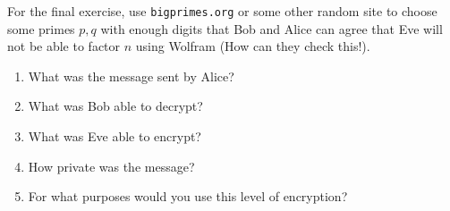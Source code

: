 \documentclass{article}
\begin{document}
    For the final exercise, use \verb|bigprimes.org| or some other random site to choose some primes $p,q$ with enough digits that Bob and Alice can agree that Eve will not be able to factor $n$ using Wolfram (How can they check this!). 

    \begin{enumerate}
        \item What was the message sent by Alice? 

            \TextField[width=6in,height=1in]{}

        \item What was Bob able to decrypt?

            \TextField[width=6in,height=1in]{}

        \item What was Eve able to encrypt?

            \TextField[width=6in,height=1in]{}

        \item How private was the message?

            \TextField[width=6in,height=1in]{}

        \item For what purposes would you use this level of encryption?

            \TextField[width=6in,height=1in]{}

    \end{enumerate}
\end{document}
